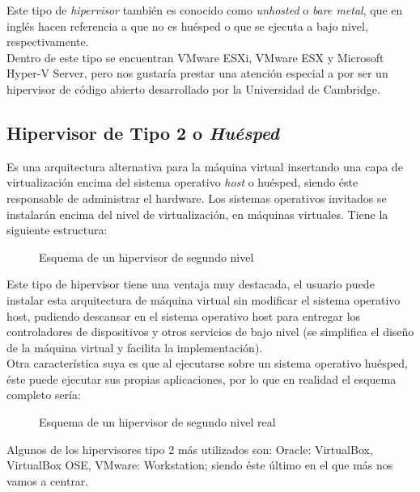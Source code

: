 Este tipo de \emph{hipervisor} también es conocido como \emph{unhosted} o \emph{bare metal}, que en inglés hacen referencia a que no es huésped o que se ejecuta a bajo nivel, respectivamente.\\

Dentro de este tipo se encuentran VMware ESXi, VMware ESX y Microsoft Hyper-V Server, pero nos gustaría prestar una atención especial a  por ser un hipervisor de código abierto desarrollado por la Universidad de Cambridge\cite{proyectoxen}\cite{proyectoxen2}.
\subsection{Hipervisor de Tipo 2 o \emph{Huésped}}\label{tiposvir2}
Es una arquitectura alternativa para la máquina virtual insertando una capa de virtualización encima del sistema operativo \emph{host} o huésped, siendo éste responsable de administrar el hardware. Los sistemas operativos invitados se instalarán encima del nivel de virtualización, en máquinas virtuales. Tiene la siguiente estructura:

\begin{figure}[H]
\begin{center}
\end{center}
\caption[Hipervisor Tipo 2]{Esquema de un hipervisor de segundo nivel}
\end{figure}

Este tipo de hipervisor tiene una ventaja muy destacada, el usuario puede instalar esta arquitectura de máquina virtual sin modificar el sistema operativo host, pudiendo descansar en el sistema operativo host para entregar los controladores de dispositivos y otros servicios de bajo nivel (se simplifica el diseño de la máquina virtual y facilita la implementación).\\

Otra característica suya es que al ejecutarse sobre un sistema operativo huésped, éste puede ejecutar sus propias aplicaciones, por lo que en realidad el esquema completo sería:

\begin{figure}[H]
\begin{center}
\end{center}
\caption[Hipervisor Tipo 2 final]{Esquema de un hipervisor de segundo nivel real}
\end{figure}

Algunos de los hipervisores tipo 2 más utilizados son: Oracle: VirtualBox, VirtualBox OSE, VMware: Workstation; siendo éste último en el que más nos vamos a centrar.

